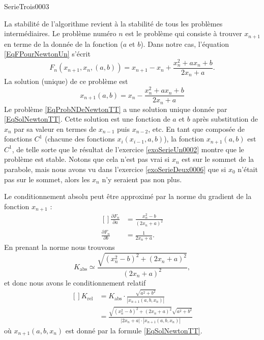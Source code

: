 
\begin{corrige}{SerieTrois0003}

	La stabilité de l'algorithme revient à la stabilité de tous les problèmes intermédiaires. Le problème numéro $n$ est le problème qui consiste à trouver $x_{n+1}$ en terme de la donnée de la fonction ($a$ et $b$). Dans notre cas, l'équation \eqref{EqFPourNewtonUn} s'écrit
	\begin{equation}		\label{EqProbNDeNewtonTT}
		F_n(x_{n+1},x_n,(a,b))=x_{n+1}-x_n+\frac{ x_n^2+ax_n+b }{ 2x_n+a }.
	\end{equation}
	La solution (unique) de ce problème est
	\begin{equation}		\label{EqSolNewtonTT}
		x_{n+1}(a,b)=x_n-\frac{ x_n^2+ax_n+b }{ 2x_n+a }
	\end{equation}
	Le problème \eqref{EqProbNDeNewtonTT} a une solution unique donnée par \eqref{EqSolNewtonTT}. Cette solution est une fonction de $a$ et $b$ après substitution de $x_n$ par sa valeur en termes de $x_{n-1}$ puis $x_{n-2}$, etc. En tant que composée de fonctions $C^1$ (chacune des fonctions $x_i(x_{i-1},a,b)$), la fonction $x_{n+1}(a,b)$ est $C^1$, de telle sorte que le résultat de l'exercice \ref{exoSerieUn0002} montre que le problème est stable. Notons que cela n'est pas vrai si $x_n$ est sur le sommet de la parabole, mais nous avons vu dans l'exercice \ref{exoSerieDeux0006} que si $x_0$ n'était pas sur le sommet, alors les $x_n$ n'y seraient pas non plus.

	Le conditionnement absolu peut être approximé par la norme du gradient de la fonction $x_{n+1}$ :
	\begin{equation}
		\begin{aligned}[]
			\frac{ \partial F_n }{ \partial a }&=\frac{ x_n^2-b }{ (2x_n+a)^2 }\\
			\frac{ \partial F_n }{ \partial b }&=\frac{1}{ 2x_n+a }.
		\end{aligned}
	\end{equation}
	En prenant la norme nous trouvons
	\begin{equation}
		K_{\text{abs}}\simeq \frac{ \sqrt{(x_n^2-b)^2+(2x_n+a)^2} }{ (2x_n+a)^2 },
	\end{equation}
	et donc nous avons le conditionnement relatif
	\begin{equation}\label{EqKReltroitroti}
		\begin{aligned}[]
			K_{\text{rel}}&=K_{\text{abs}}\cdot\frac{ \sqrt{a^2+b^2} }{ | x_{n+1}(a,b,x_n) | }\\
			&=\frac{ \sqrt{(x_n^2-b)^2+(2x_n+a)^2}\sqrt{a^2+b^2} }{ | 2x_n+a |\cdot| x_{n+1}(a,b,x_n) | }
		\end{aligned}
	\end{equation}
	où $x_{n+1}(a,b,x_n)$ est donné par la formule \eqref{EqSolNewtonTT}.


\end{corrige}
